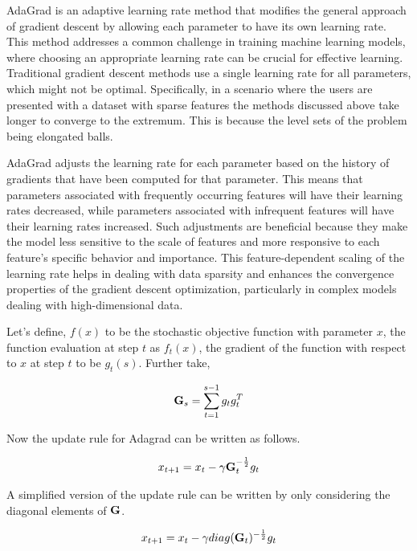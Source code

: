 AdaGrad is an adaptive learning rate method that modifies the general approach of gradient descent by allowing each parameter to have its own learning rate. This method addresses a common challenge in training machine learning models, where choosing an appropriate learning rate can be crucial for effective learning. Traditional gradient descent methods use a single learning rate for all parameters, which might not be optimal. Specifically, in a scenario where the users are presented with a dataset with sparse features the methods discussed above take longer to converge to the extremum. This is because the level sets of the problem being elongated balls. 

AdaGrad adjusts the learning rate for each parameter based on the history of gradients that have been computed for that parameter. This means that parameters associated with frequently occurring features will have their learning rates decreased, while parameters associated with infrequent features will have their learning rates increased. Such adjustments are beneficial because they make the model less sensitive to the scale of features and more responsive to each feature's specific behavior and importance. This feature-dependent scaling of the learning rate helps in dealing with data sparsity and enhances the convergence properties of the gradient descent optimization, particularly in complex models dealing with high-dimensional data. 

Let's define, $f(x)$ to be the stochastic objective function with parameter $x$, the function evaluation at step $t$ as $f_{t}(x)$, the gradient of the function with respect to $x$ at step $t$ to be $g_{t}(s)$. Further take,

\begin{align}
    \mathbf{G}_s = \sum_{t = 1}^{s-1} g_t g_t^T
\end{align}

Now the update rule for Adagrad can be written as follows.

\begin{align}
    x_{t+1} = x_{t} - \gamma \mathbf{G}_t^{-\frac{1}{2}} g_t
\end{align}

A simplified version of the update rule can be written by only considering the diagonal elements of $\mathbf{G}$.


\begin{align}
    x_{t+1} = x_{t} - \gamma diag(\mathbf{G}_t)^{-\frac{1}{2}} g_t
\end{align}


